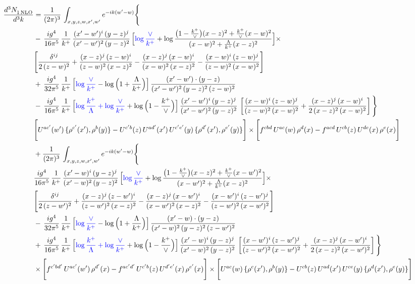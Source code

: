 \documentclass[9pt]{article}
\numberwithin{equation}{section}
\begin{document}
\begin{align}
 \frac{d^{3}N_{1\,\rm NLO}^{\rm}}{d^{3}k}  & =    \frac{1}{(2\pi)^{3}}\,\int_{x,y,z,w,x',w^{\prime}} e^{-ik(w^{\prime}-w)}\Bigg\{ \notag \\ & -\, \frac{ig^{4}}{16\pi^{5}}\,\frac{1}{k^{+}}\, \frac{(x'-w')^{i}\,(y-z)^{j}}{(x'-w')^{2}\,(y-z)^{2}}\,\Big[{\color{blue}\log\frac{\vee}{k^{+}}}+\log\frac{\big(1-\frac{k^{+}}{\vee}\big)(x-z)^{2}+\frac{k^{+}}{\vee}(x-w)^{2}}{(x-w)^{2}+\frac{\Lambda}{k^{+}}(x-z)^{2}}\Big]\times\notag \\ &  \Bigg[\frac{\delta^{ij}}{2\,(z-w)^{2}}+\frac{(x-z)^{j}\,(z-w)^{i}}{(z-w)^{2}\,(x-z)^{2}}-\frac{(x-z)^{j}\,(x-w)^{i}}{(x-w)^{2}\,(x-z)^{2}}-\frac{(x-w)^{i}\,(z-w)^{j}}{(z-w)^{2}\,(x-w)^{2}}\Bigg]\notag \\ & +\,\frac{ig^{4}}{32\pi^{5}}\,\frac{1}{k^{+}}\,\Big[{\color{blue}\log\frac{\vee}{k^{+}}}-\log\Big(1+\frac{\Lambda}{k^{+}}\Big)\Big]\, \frac{(x'-w')\cdot (y-z)}{(x'-w')^{2}\,(y-z)^{2}\,(z-w)^{2}}\notag \\ & -\, \frac{ig^{4}}{16\pi^{5}}\,\frac{1}{k^{+}}\,\Big[{\color{blue}\log\frac{k^{+}}{\Lambda}+\log\frac{\vee}{k^{+}}}+\log\Big(1-\frac{k^{+}}{\vee}\Big)\Big]\,\frac{(x'-w')^{i}\,(y-z)^{j}}{(x'-w')^{2}\,(y-z)^{2}}\,\left[\frac{(x-w)^{i}\,(z-w)^{j}}{(z-w)^{2}\,(x-w)^{2}}+\frac{(x-z)^{j}\,(x-w)^{i}}{2\,(x-z)^{2}\, (x-w)^{2}}\right]\Bigg\} \notag \\ & \Bigg[U^{ac'}(w')\,\{\rho^{c'}(x'),\rho^{b}(y)\}-U^{c'b}(z)\,U^{ad'}(x')\,U^{c'e'}(y)\, \{\rho^{d'}(x'),\rho^{e'}(y)\}\Bigg]\times \Bigg[f^{cbd}\,U^{ac}(w)\,\rho^{d}(x)-f^{acd}\, U^{cb}(z)\,U^{de}(x)\,\rho^{e}(x)\Bigg]\notag \\ & + \frac{1}{(2\pi)^{3}}\,\int_{x,y,z,w,x',w^{\prime}} e^{-ik(w^{\prime}-w)}\Bigg\{ \notag \\ &  \frac{ig^{4}}{16\pi^{5}}\,\frac{1}{k^{+}}\, \frac{(x'-w)^{i}\,(y-z)^{j}}{(x'-w)^{2}\,(y-z)^{2}}\,\Big[{\color{blue}\log\frac{\vee}{k^{+}}}+\log\frac{\big(1-\frac{k^{+}}{\vee}\big)(x-z)^{2}+\frac{k^{+}}{\vee}(x-w')^{2}}{(x-w')^{2}+\frac{\Lambda}{k^{+}}(x-z)^{2}}\Big]\times\notag \\ &  \Bigg[\frac{\delta^{ij}}{2\,(z-w')^{2}}+\frac{(x-z)^{j}\,(z-w')^{i}}{(z-w')^{2}\,(x-z)^{2}}-\frac{(x-z)^{j}\,(x-w')^{i}}{(x-w')^{2}\,(x-z)^{2}}-\frac{(x-w')^{i}\,(z-w')^{j}}{(z-w')^{2}\,(x-w')^{2}}\Bigg]\notag \\ & -\,\frac{ig^{4}}{32\pi^{5}}\,\frac{1}{k^{+}}\,\Big[{\color{blue}\log\frac{\vee}{k^{+}}}-\log\Big(1+\frac{\Lambda}{k^{+}}\Big)\Big]\, \frac{(x'-w)\cdot (y-z)}{(x'-w)^{2}\,(y-z)^{2}\,(z-w')^{2}}\notag \\ & +\,\frac{ig^{4}}{16\pi^{5}}\,\frac{1}{k^{+}}\,\Big[{\color{blue}\log\frac{k^{+}}{\Lambda}+\log\frac{\vee}{k^{+}}}+\log\Big(1-\frac{k^{+}}{\vee}\Big)\Big]\,\frac{(x'-w)^{i}\,(y-z)^{j}}{(x'-w)^{2}\,(y-z)^{2}}\,\left[\frac{(x-w')^{i}\,(z-w')^{j}}{(z-w')^{2}\,(x-w')^{2}}+\frac{(x-z)^{j}\,(x-w')^{i}}{2\,(x-z)^{2}\, (x-w')^{2}}\right] \Bigg\} \notag \\ & \times\Bigg[f^{c'bd'}\,U^{ac'}(w')\,\rho^{d'}(x)-f^{ac'd'}\, U^{c'b}(z)\,U^{d'e'}(x)\,\rho^{e'}(x)\Bigg] \times \Bigg[U^{ac}(w)\,\{\rho^{c}(x'),\rho^{b}(y)\}-U^{cb}(z)\,U^{ad}(x')\,U^{ce}(y)\, \{\rho^{d}(x'),\rho^{e}(y)\}\Bigg]
\end{align}
\end{document}
